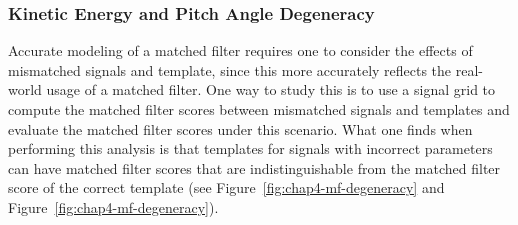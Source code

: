\subsubsection*{Kinetic Energy and Pitch Angle Degeneracy}

Accurate modeling of a matched filter requires one to consider the effects of mismatched signals and template, since this more accurately reflects the real-world usage of a matched filter. One way to study this is to use a signal grid to compute the matched filter scores between mismatched signals and templates and evaluate the matched filter scores under this scenario. What one finds when performing this analysis is that templates for signals with incorrect parameters can have matched filter scores that are indistinguishable from the matched filter score of the correct template (see Figure~\ref{fig:chap4-mf-degeneracy} and Figure~\ref{fig:chap4-mf-degeneracy}).
